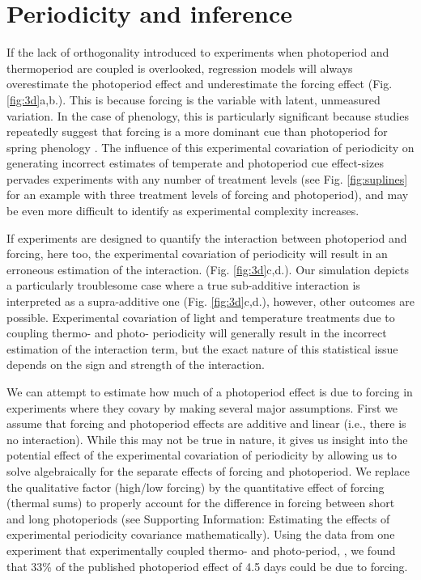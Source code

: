\documentclass[11pt]{article}
\begin{document}
\section*{Periodicity and inference}
If the lack of orthogonality introduced to experiments when photoperiod and thermoperiod are coupled is overlooked, regression models will always overestimate the photoperiod effect and underestimate the forcing effect (Fig. \ref{fig:3d}a,b.). This is because forcing is the variable with latent, unmeasured variation. In the case of phenology, this is particularly significant because studies repeatedly suggest that forcing is a more dominant cue than photoperiod for spring phenology \citep{CHUINE:2010wg,Zohner:2016uz,Gauzere2019}. The influence of this experimental covariation of periodicity on generating incorrect estimates of temperate and photoperiod cue effect-sizes pervades experiments with any number of treatment levels (see Fig. \ref{fig:suplines} for an example with three treatment levels of forcing and photoperiod), and may be even more difficult to identify as experimental complexity increases.

If experiments are designed to quantify the interaction between photoperiod and forcing, here too, the experimental covariation of periodicity will result in an erroneous estimation of the interaction. (Fig. \ref{fig:3d}c,d.). Our simulation depicts a particularly troublesome case where a true sub-additive interaction is interpreted as a supra-additive one (Fig. \ref{fig:3d}c,d.), however, other outcomes are possible. Experimental covariation of light and temperature treatments due to coupling thermo- and photo- periodicity will generally result in the incorrect estimation of the interaction term, but the exact nature of this statistical issue depends on the sign and strength of the interaction. 

We can attempt to estimate how much of a photoperiod effect is due to forcing in experiments where they covary by making several major assumptions. First we assume that forcing and photoperiod effects are additive and linear (i.e., there is no interaction). While this may not be true in nature, it gives us insight into the potential effect of the experimental covariation of periodicity by allowing us to solve algebraically for the separate effects of forcing and photoperiod. We replace the qualitative factor (high/low forcing) by the quantitative effect of forcing (thermal sums) to properly account for the difference in forcing between short and long photoperiods (see Supporting Information: Estimating the effects of experimental periodicity covariance mathematically). Using the data from one experiment that experimentally coupled thermo- and photo-period, \citet{Flynn2018}, we found that 33\% of the published photoperiod effect of 4.5 days could be due to forcing. 
\end{document}
